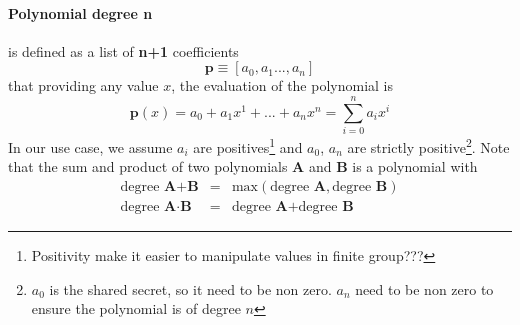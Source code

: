 \documentclass[a4paper,10pt]{article}
\begin{document}
\paragraph{Polynomial degree n} is defined as a list of \textbf{n+1} coefficients
\[ 
\textbf{p} \equiv [a_0, a_1 ... , a_n]
\]
that providing any value $x$, the evaluation of the polynomial is 
\[ 
\textbf{p}(x) = a_0 + a_1 x^1 +...+ a_n x^n = \sum^{n}_{i=0} a_i x^i
\]
In our use case, we assume $a_i$ are positives\footnote{Positivity make it easier to manipulate values in finite group???} and $a_0$, $a_n$ are strictly positive\footnote{$a_0$ is the shared secret, so it need to be non zero. $a_n$ need to be non zero to ensure the polynomial is of degree $n$}. Note that the sum and product of two polynomials \textbf{A} and \textbf{B} is a polynomial with
\[
\begin{array}{rcl}
\text{degree } \textbf{A} + \textbf{B} & = & \text{max}(\text{degree }\textbf{A}, \text{degree }\textbf{B}) \\
\text{degree } \textbf{A} \cdot \textbf{B} & = & \text{degree }\textbf{A} + \text{degree }\textbf{B}
\end{array}
\]
\end{document}
